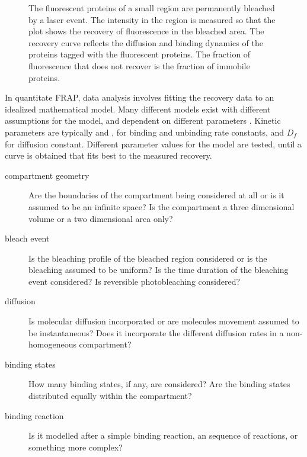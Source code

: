 \begin{figure}

                   {The fluorescent proteins of a small region are
                    permanently bleached by a laser event. The
                    intensity in the region is measured so that the
                    plot shows the recovery of fluorescence in the
                    bleached area.  The recovery curve reflects the
                    diffusion and binding dynamics of the proteins
                    tagged with the fluorescent proteins.  The
                    fraction of fluorescence that does not recover is
                    the fraction of immobile proteins.}
      \label{fig:intro:frap-curve-example}
    \end{figure}

    In quantitate FRAP, data analysis involves fitting the recovery
    data to an idealized mathematical model.
    Many different models exist with different assumptions for the
    model, and dependent on different
    parameters \citep{mcnally-frap-2010}.
    Kinetic parameters are typically \Kon{} and \Koff{}, for
    binding and unbinding rate constants, and $D_{f}$ for diffusion constant.
    Different parameter values for the model are tested, until a curve is
    obtained that fits best to the measured recovery.

    \begin{description}
    \item[compartment geometry] Are the boundaries of the compartment
      being considered at all or is it assumed to be an infinite space?
      Is the compartment a three dimensional volume or a two
      dimensional area only?
    \item[bleach event] Is the bleaching profile of the bleached
      region considered or is the bleaching assumed to be uniform?  Is
      the time duration of the bleaching event considered?  Is
      reversible photobleaching considered?
    \item[diffusion] Is molecular diffusion incorporated or are
      molecules movement assumed to be instantaneous?  Does it
      incorporate the different diffusion rates in a non-homogeneous
      compartment?
    \item[binding states] How many binding states, if any, are
      considered?  Are the binding states distributed equally within
      the compartment?
    \item[binding reaction] Is it modelled after a simple binding
      reaction, an sequence of reactions, or something more complex?
    \end{description}


